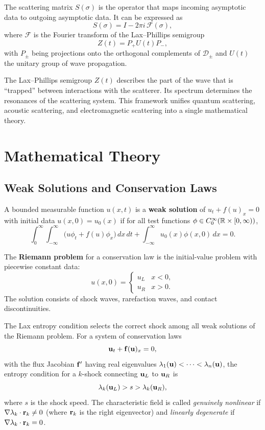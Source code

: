 \begin{theorem}
The scattering matrix \(S(\sigma)\) is the operator that maps incoming asymptotic data to outgoing asymptotic data. It can be expressed as
\[
S(\sigma) = I - 2\pi i\, \mathcal{F}(\sigma),
\]
where \(\mathcal{F}\) is the Fourier transform of the Lax--Phillips semigroup
\[
Z(t) = P_+ U(t) P_-,
\]
with \(P_\pm\) being projections onto the orthogonal complements of \(\mathcal{D}_\pm\) and \(U(t)\) the unitary group of wave propagation.
\end{theorem}

The Lax--Phillips semigroup \(Z(t)\) describes the part of the wave that is ``trapped'' between interactions with the scatterer. Its spectrum determines the resonances of the scattering system. This framework unifies quantum scattering, acoustic scattering, and electromagnetic scattering into a single mathematical theory.

\section{Mathematical Theory}

\subsection{Weak Solutions and Conservation Laws}

\begin{definition}
A bounded measurable function \(u(x,t)\) is a \textbf{weak solution} of \(u_t + f(u)_x = 0\) with initial data \(u(x,0) = u_0(x)\) if for all test functions \(\phi \in C_0^\infty(\mathbb{R} \times [0,\infty))\),
\[
\int_0^\infty \int_{-\infty}^\infty \bigl(u \phi_t + f(u) \phi_x\bigr)\,dx\,dt + \int_{-\infty}^\infty u_0(x) \phi(x,0)\,dx = 0.
\]
\end{definition}

\begin{definition}
The \textbf{Riemann problem} for a conservation law is the initial-value problem with piecewise constant data:
\[
u(x,0) = \begin{cases}
u_L & x < 0,\\
u_R & x > 0.
\end{cases}
\]
The solution consists of shock waves, rarefaction waves, and contact discontinuities.
\end{definition}

The Lax entropy condition selects the correct shock among all weak solutions of the Riemann problem. For a system of conservation laws
\[
\vb{u}_t + \vb{f}(\vb{u})_x = 0,
\]
with the flux Jacobian \(\vb{f}'\) having real eigenvalues \(\lambda_1(\vb{u}) < \cdots < \lambda_n(\vb{u})\), the entropy condition for a \(k\)-shock connecting \(\vb{u}_L\) to \(\vb{u}_R\) is
\[
\lambda_k(\vb{u}_L) > s > \lambda_k(\vb{u}_R),
\]
where \(s\) is the shock speed. The characteristic field is called \textit{genuinely nonlinear} if \(\nabla \lambda_k \cdot \vb{r}_k \neq 0\) (where \(\vb{r}_k\) is the right eigenvector) and \textit{linearly degenerate} if \(\nabla \lambda_k \cdot \vb{r}_k = 0\).

